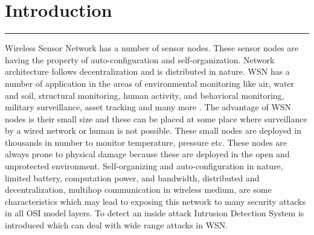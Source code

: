 \chapter{Introduction}
\label{C1} %
\graphicspath{{Figures/PDF/}{Figures/PNG/}}
\noindent\rule{\linewidth}{2pt}

\noindent Wireless Sensor Network has a number of sensor nodes. These sensor nodes are having the property of auto-configuration and self-organization. Network architecture follows decentralization and is distributed in nature. WSN has a number of application in the areas of environmental monitoring like air, water and soil, structural monitoring, human activity, and behavioral monitoring, military surveillance, asset tracking and many more \cite{akyildiz2002wireless}. The advantage of WSN nodes is their small size and these can be placed at some place where surveillance by a wired network or human is not possible. These small nodes are deployed in thousands in number to monitor temperature, pressure etc. These nodes are always prone to physical damage because these are deployed in the open and unprotected environment. Self-organizing and auto-configuration in nature, limited battery, computation power, and bandwidth, distributed and decentralization, multihop communication in wireless medium, are some characteristics which may lead to exposing this network to many security attacks in all OSI model layers. 
To detect an inside attack Intrusion Detection System is introduced which can deal with wide range attacks in WSN.
\par

